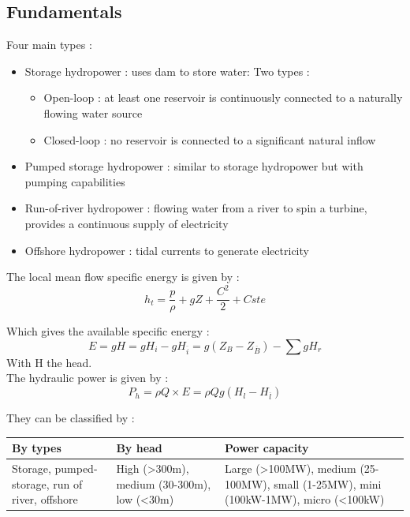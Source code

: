 \documentclass[../main.tex]{subfiles}
\begin{document}
\localtableofcontents

\subsection{Fundamentals}
Four main types : \begin{itemize}
    \item Storage hydropower : uses dam to store water: Two types : \begin{itemize}
        \item Open-loop : at least one reservoir is continuously connected to a naturally flowing water source\\
        \item Closed-loop : no reservoir is connected to a significant natural inflow\\
    \end{itemize}
    \item Pumped storage hydropower : similar to storage hydropower but with pumping capabilities\\
    \item Run-of-river hydropower : flowing water from a river to spin a turbine, provides a continuous supply of electricity\\
    \item Offshore hydropower : tidal currents to generate electricity\\
\end{itemize}
The local mean flow specific energy is given by : \begin{equation}
    h_t = \frac{p}{\rho} + gZ + \frac{C^2}{2} + Cste
\end{equation}

Which gives the available specific energy : \begin{equation}
    E = gH = gH_i - gH_{\overline{i}} = g(Z_B - Z_{\overline{B}}) - \sum gH_r
\end{equation}
With H the head.\\

The hydraulic power is given by : \begin{equation}
    P_h = \rho Q \times E = \rho Q g(H_l - H_{\overline{l}})
\end{equation}

They can be classified by : \begin{table}[hbt!]
    \centering
    \begin{tabular}{p{}|p{}|p{}}
        By types & By head & Power capacity \\ \hline
        Storage, pumped-storage, run of river, offshore & High (>300m), medium (30-300m), low (<30m) & Large (>100MW), medium (25-100MW), small (1-25MW), mini (100kW-1MW), micro (<100kW)
    \end{tabular}
\end{table}
\end{document}
